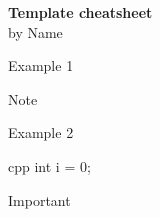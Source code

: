 \documentclass[10pt, a4paper, landscape]{article}
\begin{document}
	
\begin{onehalfspace}
	
	\begin{multicols*}{4}
	
		\begin{flushleft}
			\LARGE{\bf{\textcolor{\mainColor}{\textbf{Template cheatsheet}}}} \\
			\large{by \textcolor{\mainColor}{Name}}
		\end{flushleft}
		
		\begin{Text}{Example 1}
			 \lipsum[1]
			
			\begin{Note}{Note}
				\lipsum[2]
			\end{Note}
		
			\lipsum[3-4]
		\end{Text}
	
		\begin{Text}{Example 2}		
			\lipsum[2]
\begin{Code}{cpp}
int i = 0;
\end{Code}
			
			\begin{Important}{Important}
				\lipsum[2]
			\end{Important}
			
			\lipsum[3-6]
		\end{Text}
		
	\end{multicols*}

\end{onehalfspace}
	
\end{document}
